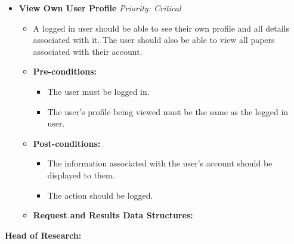 \documentclass{article}
\begin{document}
\begin{itemize}
					\item \textbf{View Own User Profile} \hfill \textit{Priority: Critical}
					\begin{itemize}
						\item A logged in user should be able to see their own profile and all details associated with it. The user should also be able to view all papers associated with their account.
						\item \textbf{Pre-conditions:}
						\begin{itemize}
							\item The user must be logged in.
							\item The user's profile being viewed must be the same as the logged in user.
						\end{itemize}
						\item \textbf{Post-conditions:}
						\begin{itemize}
							\item The information associated with the user's account should be displayed to them.
							\item The action should be logged.
						\end{itemize}
						\item \textbf{Request and Results Data Structures:}
					\end{itemize}					
				\end{itemize}
				\textbf{Head of Research:}
				
\end{document}
